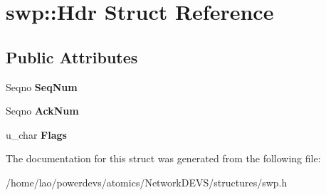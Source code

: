 \hypertarget{structswp_1_1Hdr}{}\section{swp\+:\+:Hdr Struct Reference}
\label{structswp_1_1Hdr}
\subsection*{Public Attributes}
\begin{DoxyCompactItemize}
\item 
Seqno {\bfseries Seq\+Num}\hypertarget{structswp_1_1Hdr_a2c4899f7de5ac69d97e0944abadfd80a}{}\label{structswp_1_1Hdr_a2c4899f7de5ac69d97e0944abadfd80a}

\item 
Seqno {\bfseries Ack\+Num}\hypertarget{structswp_1_1Hdr_a8f1b40013225b925c8e88d4486d24733}{}\label{structswp_1_1Hdr_a8f1b40013225b925c8e88d4486d24733}

\item 
u\+\_\+char {\bfseries Flags}\hypertarget{structswp_1_1Hdr_a7e60a051ee14be6f6eb1da4f8a01b7a9}{}\label{structswp_1_1Hdr_a7e60a051ee14be6f6eb1da4f8a01b7a9}

\end{DoxyCompactItemize}


The documentation for this struct was generated from the following file\+:\begin{DoxyCompactItemize}
\item 
/home/lao/powerdevs/atomics/\+Network\+D\+E\+V\+S/structures/swp.\+h\end{DoxyCompactItemize}
